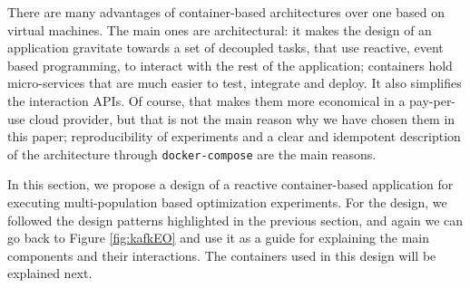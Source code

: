 \documentclass[review]{elsarticle}
\begin{document}
There are many advantages of container-based architectures over one
based on virtual machines. The main ones are architectural: it makes
the design of an application gravitate towards a set of decoupled
tasks, that use reactive, event based programming, to interact with
the rest of the application; containers hold micro-services that are
much easier to test, integrate and deploy. It also simplifies
the interaction APIs. Of course, that makes them more economical in a
pay-per-use cloud provider, but that is not the main reason why we
have chosen them in this paper; reproducibility of experiments and a
clear and idempotent description of the architecture through {\tt docker-compose} 
are the main reasons. 

In this section, we propose a design of a reactive container-based application
for executing multi-population based optimization experiments.  For the design,
we followed the design patterns highlighted in the previous section, and again
we can go back to Figure \ref{fig:kafkEO} and use it as a guide for explaining
the main components and their interactions. The containers used in this design will be explained next. 



 
\end{document}
